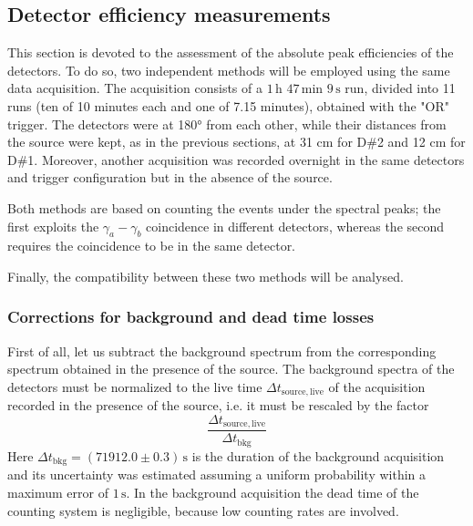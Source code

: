 \documentclass[a4paper]{article}
\begin{document}
\subsection{Detector efficiency measurements} \label{sect. efficiency}
This section is devoted to the assessment of the absolute peak efficiencies of the detectors. To do so, two independent methods will be employed using the same data acquisition. The acquisition consists of a $1\,\mathrm{h}\,\,47\,\mathrm{min}\,\,9\,\mathrm{s}$ 
run, divided into 11 runs (ten of 10 minutes each and one of 7.15 minutes), obtained with the "OR" trigger. 
The detectors were at 180° from each other, while their distances from the source were kept, as in the previous sections, at 31 cm for D\#2 and 12 cm for D\#1.
Moreover, another acquisition was recorded overnight in the same detectors and trigger configuration but in the absence of the source. 

Both methods are based on counting the events under the spectral peaks; the first exploits the $\gamma_a-\gamma_b$ coincidence in different detectors, whereas the second requires the coincidence to be in the same detector. 

Finally, the compatibility between these two methods will be analysed.

\subsubsection{Corrections for background and dead time losses}
First of all, let us subtract the background spectrum from the corresponding spectrum obtained in the presence of the source. The background spectra of the detectors must be normalized to the live time $\Delta t_\mathrm{source,live}$ of the acquisition recorded in the presence of the source, i.e. it must be rescaled by the factor
\[\frac{\Delta t_\mathrm{source,live}}{\Delta t_\mathrm{bkg}}\]
Here $\Delta t_\mathrm{bkg}=(71912.0\pm0.3)\,\mathrm{s}$ is the duration of the background acquisition and its uncertainty was estimated assuming a uniform probability within a maximum error of $1\,\mathrm{s}$. In the background acquisition the dead time of the counting system is negligible, because low counting rates are involved. 
\end{document}
